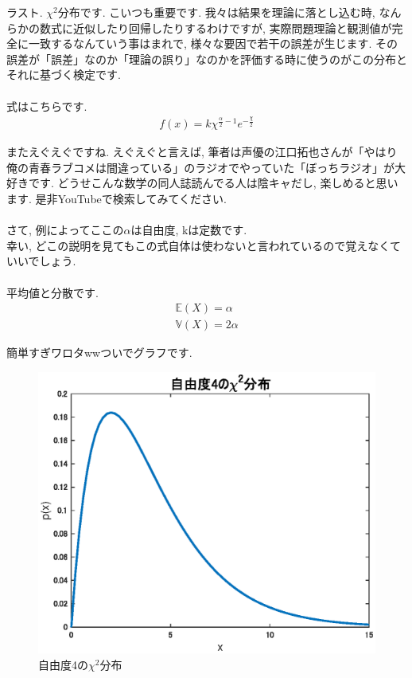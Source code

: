 \documentclass[11pt,a4paper]{ujreport} 	%
\begin{document}
ラスト. $\chi^2$分布です. こいつも重要です. 我々は結果を理論に落とし込む時, なんらかの数式に近似したり回帰したりするわけですが, 実際問題理論と観測値が完全に一致するなんていう事はまれで, 様々な要因で若干の誤差が生じます. その誤差が「誤差」なのか「理論の誤り」なのかを評価する時に使うのがこの分布とそれに基づく検定です. \\
\\
式はこちらです. 
\begin{align}
f(x) = k\chi^{\frac{\alpha}{2}-1}e^{-\frac{\chi}{2}}
\end{align}

またえぐえぐですね. えぐえぐと言えば, 筆者は声優の江口拓也さんが「やはり俺の青春ラブコメは間違っている」のラジオでやっていた「ぼっちラジオ」が大好きです. どうせこんな数学の同人誌読んでる人は陰キャだし, 楽しめると思います. 是非YouTubeで検索してみてください.\\
\\

さて, 例によってここの$\alpha$は自由度, kは定数です.\\

幸い, どこの説明を見てもこの式自体は使わないと言われているので覚えなくていいでしょう.\\
\\

平均値と分散です.
\begin{align}
\mathbb{E}(X) = \alpha \\
\mathbb{V}(X) = 2\alpha
\end{align}

簡単すぎワロタwwついでグラフです.


\begin{figure}[H]
\label{im:chi}
  \centering
  \includegraphics[width=120mm]{../figures/chi2.eps}
  \caption{自由度4の$\chi^2$分布}
\end{figure}
 
\end{document}
